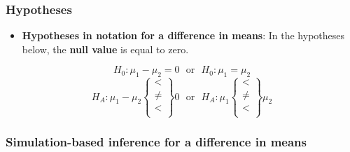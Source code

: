 \documentclass[
]{report}
\providecommand{\tightlist}{%
  \setlength{\itemsep}{0pt}\setlength{\parskip}{0pt}}
\begin{document}
\vspace{1mm}

\subsubsection*{Hypotheses}\label{hypotheses-1}

\begin{itemize}
\tightlist
\item
  \textbf{Hypotheses in notation for a difference in means}: In the hypotheses below, the \textbf{null value} is equal to zero.
\end{itemize}

\[H_0: \mu_1 - \mu_2 = 0 ~~~ \text{or}~~~ H_0: \mu_1 = \mu_2 \]
\[H_A: \mu_1 - \mu_2 \left\{
\begin{array}{ll}
< \\
\ne \\
< \\
\end{array}
\right\}
0 
~~~ \text{or} ~~~ H_A:
\mu_1 \left\{
\begin{array}{ll}
< \\
\ne \\
< \\
\end{array}
\right\}
\mu_2 \]

\subsubsection*{Simulation-based inference for a difference in means}\label{simulation-based-inference-for-a-difference-in-means}
\end{document}
